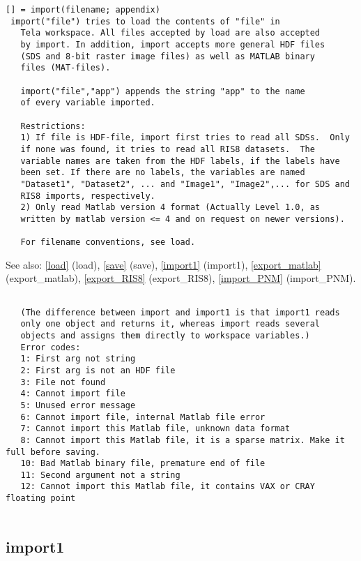 \documentclass[a4paper]{article}
\begin{document}
\begin{tscreen}
\begin{verbatim}
[] = import(filename; appendix)
 import("file") tries to load the contents of "file" in
   Tela workspace. All files accepted by load are also accepted
   by import. In addition, import accepts more general HDF files
   (SDS and 8-bit raster image files) as well as MATLAB binary
   files (MAT-files).
   
   import("file","app") appends the string "app" to the name
   of every variable imported.
   
   Restrictions:
   1) If file is HDF-file, import first tries to read all SDSs.  Only
   if none was found, it tries to read all RIS8 datasets.  The
   variable names are taken from the HDF labels, if the labels have
   been set. If there are no labels, the variables are named
   "Dataset1", "Dataset2", ... and "Image1", "Image2",... for SDS and
   RIS8 imports, respectively.
   2) Only read Matlab version 4 format (Actually Level 1.0, as
   written by matlab version <= 4 and on request on newer versions).
   
   For filename conventions, see load.
\end{verbatim}

See also: \ref{load} {(load)}, \ref{save} {(save)}, \ref{import1} {(import1)}, \ref{export_matlab} {(export\_matlab)}, \ref{export_RIS8} {(export\_RIS8)}, \ref{import_PNM} {(import\_PNM)}.
\begin{verbatim}
   
   (The difference between import and import1 is that import1 reads
   only one object and returns it, whereas import reads several
   objects and assigns them directly to workspace variables.)
   Error codes:
   1: First arg not string
   2: First arg is not an HDF file
   3: File not found
   4: Cannot import file
   5: Unused error message
   6: Cannot import file, internal Matlab file error
   7: Cannot import this Matlab file, unknown data format
   8: Cannot import this Matlab file, it is a sparse matrix. Make it full before saving.
   10: Bad Matlab binary file, premature end of file
   11: Second argument not a string
   12: Cannot import this Matlab file, it contains VAX or CRAY floating point
   
\end{verbatim}
\end{tscreen}



\subsection{import1\label{import1}}
\end{document}
